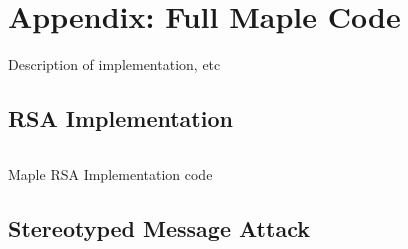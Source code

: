 \section{Appendix: Full Maple Code}

Description of implementation, etc
 
\subsection{RSA Implementation}

\begin{listing}[!ht]
\inputminted{python}{tex/code/coppersmith_rsa.mw}
\caption{Maple RSA Implementation code}
\label{listing:1}
\end{listing}

\subsection{Stereotyped Message Attack}



